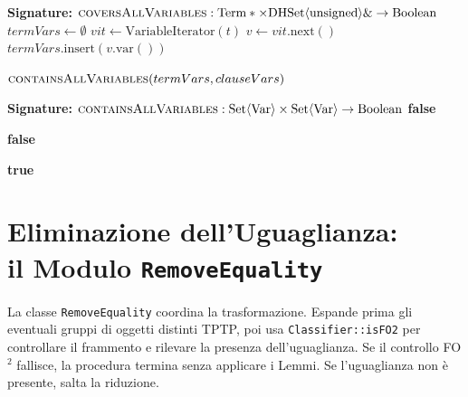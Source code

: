 \begin{algorithm}[H]
\caption{Variable Coverage Check}
\label{alg:covers_all_vars}
\begin{algorithmic}[1]
    \Statex \textbf{Signature:} $\textsc{coversAllVariables}: \text{Term}* \times \text{DHSet}\langle\text{unsigned}\rangle\& \to \text{Boolean}$
        \State $termVars \leftarrow \emptyset$
        \State $vit \leftarrow \text{VariableIterator}(t)$
            \State $v \leftarrow vit.\text{next}()$
            \State $termVars.\text{insert}(v.\text{var}())$
        \EndWhile
        
        \State \Return $\textsc{containsAllVariables}(termVars, clauseVars)$
    \EndFunction
\end{algorithmic}
\end{algorithm}

\begin{algorithm}[htpb]
\caption{Variable Coverage Check 2}
\label{alg:fo2_contains_all_variables}
\begin{algorithmic}[1]
    \Statex \textbf{Signature:} $\textsc{containsAllVariables}: \text{Set}\langle\text{Var}\rangle \times \text{Set}\langle\text{Var}\rangle \to \text{Boolean}$
            \State \Return \textbf{false}
        \EndIf
        
                \State \Return \textbf{false}
            \EndIf
        \EndFor
        
        \State \Return \textbf{true}
    \EndFunction 
\end{algorithmic}
\end{algorithm}


\newpage
\section{Eliminazione dell'Uguaglianza: \\il Modulo \texttt{RemoveEquality}}
\label{sec:remove_equality_pipeline}

La classe \texttt{RemoveEquality} coordina la trasformazione. Espande prima gli eventuali gruppi di oggetti distinti TPTP, poi usa \texttt{Classifier::isFO2} per controllare il frammento e rilevare la presenza dell'uguaglianza. Se il controllo FO$^2$ fallisce, la procedura termina senza applicare i Lemmi. Se l'uguaglianza non è presente, salta la riduzione.

